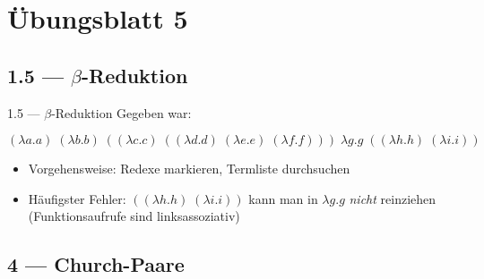 \documentclass{beamer}
\begin{document}
\newcommand{\aeq}{\stackrel{\alpha}{=}}
\newcommand{\naeq}{\stackrel{\alpha}{\neq}}
\newcommand{\eeq}{\stackrel{\eta}{=}}

\newcommand{\E}{\;}

\newcommand{\liin}[2]{#1\E{}#2}
\newcommand{\liiin}[3]{#1\E{}#2\E{}#3}
\newcommand{\livn}[4]{#1\E{}#2\E{}#3\E{}#4}
\newcommand{\lvn}[5]{#1\E{}#2\E{}#3\E{}#4\E{}#5}

\newcommand{\lii}[2]{(#1\E{}#2)}
\newcommand{\liii}[3]{(#1\E{}#2\E{}#3)}

\newcommand{\liir}[2]{\textcolor{red}{\underline{(}}#1\E{}#2\textcolor{red}{\underline{)}}}
\newcommand{\liiir}[3]{\textcolor{red}{\underline{(}}#1\E{}#2\E{}#3\textcolor{red}{\underline{)}}}

\newcommand{\subst}[3]{(#1)\left[#2\,\to\,#3\right]}

\newcommand{\abs}[2]{\lambda{}#1.#2}

\section{Übungsblatt 5}

\subsection{1.5 --- $\beta$-Reduktion}


\begin{frame}{1.5 --- $\beta$-Reduktion}
	Gegeben war:

	\begin{equation*}
		\lvn{(\abs{a}{a})}{(\abs{b}{b})}{\lii{(\abs{c}{c})}{\liii{(\abs{d}{d})}{(\abs{e}{e})}{(\abs{f}{f})}}}{\abs{g}{g}}{\lii{(\abs{h}{h})}{(\abs{i}{i})}}
	\end{equation*}

	\begin{itemize}
		\item Vorgehensweise: Redexe markieren, Termliste durchsuchen
		\item Häufigster Fehler: $\lii{(\abs{h}{h})}{(\abs{i}{i})}$ kann man in $\abs{g}{g}$ \emph{nicht} reinziehen (Funktionsaufrufe sind linksassoziativ)
	\end{itemize}
\end{frame}

\subsection{4 --- Church-Paare}
\end{document}

